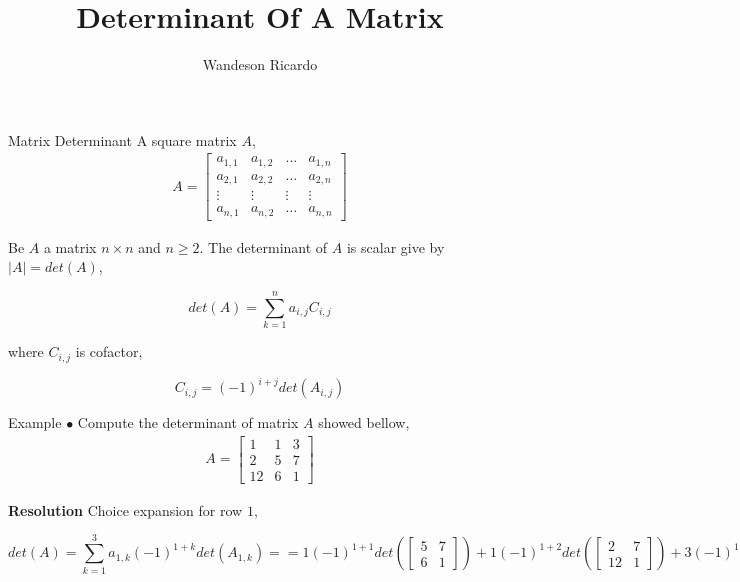 \documentclass[12pt]{beamer}
\title{Determinant Of A Matrix}
\author{Wandeson Ricardo}
\begin{document}
	\maketitle
	\begin{frame}{Matrix Determinant}
		A square matrix $A$,
		\begin{align}
			A = \begin{bmatrix}
				a_{1,1} & a_{1,2} & ... & a_{1,n} \\
				a_{2,1} & a_{2,2} & ... & a_{2,n} \\
				\vdots & \vdots & \vdots & \vdots \\
				a_{n,1} & a_{n,2} & \ldots & a_{n,n} 
			\end{bmatrix}
		\end{align}

		\begin{definition}
			Be $A$ a matrix $n \times n$ and $ n \geqslant 2 $. The determinant of $A$ is scalar give by $|A| = det(A)$, 
			
			$$ det(A) = \sum_{k=1}^{n} a_{i,j} C_{i,j}$$

			where $C_{i,j}$ is cofactor,

			$$ C_{i,j} = (-1)^{i+j} det( A_{i,j} )$$			
		\end{definition}
	\end{frame}

	\begin{frame}{Example}
		$\bullet$ Compute the determinant of matrix $A$ showed bellow,
		\begin{align*}
			A =
			\begin{bmatrix}
				1 & 1 & 3 \\
				2 & 5 & 7 \\
				12 & 6 & 1
			\end{bmatrix}
		\end{align*}
	
		\textbf{ Resolution} 
		Choice expansion for row $1$,
		
		\begin{equation*}
			det(A) = \sum_{k=1}^{3} a_{1,k} (-1)^{1+k} det\left( A_{1,k} \right) = 

			= 1 (-1)^{1+1 }det \left(
			 \begin{bmatrix}
				5 & 7 \\
				6 & 1	
			\end{bmatrix} \right)  + 1 (-1)^{1+2} det \left(
			\begin{bmatrix}
				2 & 7 \\
				12 & 1
			\end{bmatrix} \right) + 
			3 (-1)^{1+3} det \left( 
			\begin{bmatrix}
				2 & 5 \\
				12 & 6
			\end{bmatrix}
			\right) = 
			
			=  1 \cdot ( 5 \cdot 1 - 7 \cdot 6 )  + (-1)( 2 \cdot 1 - 7 \cdot 12 ) + 3 \cdot 1 \cdot (2 \cdot 6 - 5 \cdot 12 ) = 
			
			= -37 + 82  - 144 = \boxed{-99} 
			
		\end{equation*}

	\end{frame}
\end{document}
